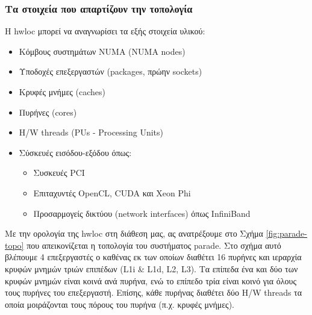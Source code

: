 \subsubsection{Τα στοιχεία που απαρτίζουν την τοπολογία}
Η hwloc μπορεί να αναγνωρίσει τα εξής στοιχεία υλικού:
\begin{itemize}
	\item Κόμβους συστημάτων NUMA (NUMA nodes)
	\item Υποδοχές επεξεργαστών (packages, πρώην sockets)
	\item Κρυφές μνήμες (caches)
	\item Πυρήνες (cores)
	\item H/W threads (PUs - Processing Units)
	\item Σύσκευές εισόδου-εξόδου όπως:
	\begin{itemize}
		\item Συσκευές PCI
		\item Επιταχυντές OpenCL, CUDA και Xeon Phi
		\item Προσαρμογείς δικτύου (network interfaces) όπως InfiniBand	
	\end{itemize}
\end{itemize}

Με την ορολογία της hwloc στη διάθεση μας, ας ανατρέξουμε στο Σχήμα \ref{fig:parade-topo} που απεικονίζεται η τοπολογία του συστήματος parade. Στο σχήμα αυτό βλέπουμε 4 επεξεργαστές ο καθένας εκ των οποίων διαθέτει 16 πυρήνες και ιεραρχία κρυφών μνημών τριών επιπέδων (L1i \& L1d, L2, L3). Τα επίπεδα ένα και δύο των κρυφών μνημών είναι κοινά ανά πυρήνα, ενώ το επίπεδο τρία είναι κοινό για όλους τους πυρήνες του επεξεργαστή. Επίσης, κάθε πυρήνας διαθέτει δύο H/W threads τα οποία μοιράζονται τους πόρους του πυρήνα (π.χ. κρυφές μνήμες).

